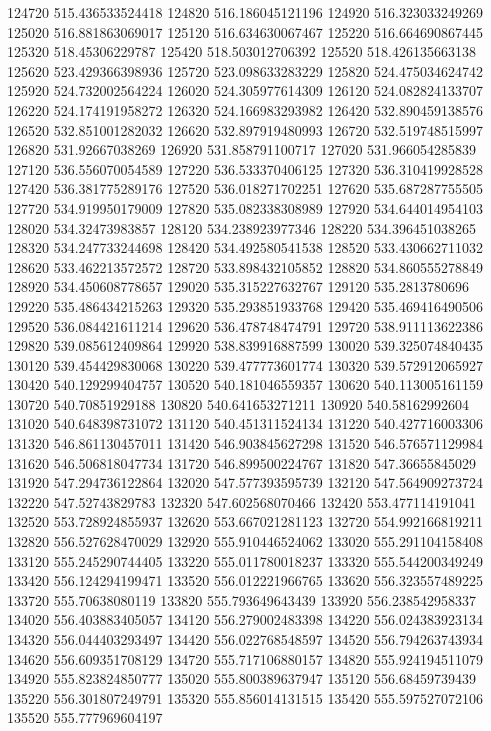 {124720 515.436533524418
124820 516.186045121196
124920 516.323033249269
125020 516.881863069017
125120 516.634630067467
125220 516.664690867445
125320 518.45306229787
125420 518.503012706392
125520 518.426135663138
125620 523.429366398936
125720 523.098633283229
125820 524.475034624742
125920 524.732002564224
126020 524.305977614309
126120 524.082824133707
126220 524.174191958272
126320 524.166983293982
126420 532.890459138576
126520 532.851001282032
126620 532.897919480993
126720 532.519748515997
126820 531.92667038269
126920 531.858791100717
127020 531.966054285839
127120 536.556070054589
127220 536.533370406125
127320 536.310419928528
127420 536.381775289176
127520 536.018271702251
127620 535.687287755505
127720 534.919950179009
127820 535.082338308989
127920 534.644014954103
128020 534.32473983857
128120 534.238923977346
128220 534.396451038265
128320 534.247733244698
128420 534.492580541538
128520 533.430662711032
128620 533.462213572572
128720 533.898432105852
128820 534.860555278849
128920 534.450608778657
129020 535.315227632767
129120 535.2813780696
129220 535.486434215263
129320 535.293851933768
129420 535.469416490506
129520 536.084421611214
129620 536.478748474791
129720 538.911113622386
129820 539.085612409864
129920 538.839916887599
130020 539.325074840435
130120 539.454429830068
130220 539.477773601774
130320 539.572912065927
130420 540.129299404757
130520 540.181046559357
130620 540.113005161159
130720 540.70851929188
130820 540.641653271211
130920 540.58162992604
131020 540.648398731072
131120 540.451311524134
131220 540.427716003306
131320 546.861130457011
131420 546.903845627298
131520 546.576571129984
131620 546.506818047734
131720 546.899500224767
131820 547.36655845029
131920 547.294736122864
132020 547.577393595739
132120 547.564909273724
132220 547.52743829783
132320 547.602568070466
132420 553.477114191041
132520 553.728924855937
132620 553.667021281123
132720 554.992166819211
132820 556.527628470029
132920 555.910446524062
133020 555.291104158408
133120 555.245290744405
133220 555.011780018237
133320 555.544200349249
133420 556.124294199471
133520 556.012221966765
133620 556.323557489225
133720 555.70638080119
133820 555.793649643439
133920 556.238542958337
134020 556.403883405057
134120 556.279002483398
134220 556.024383923134
134320 556.044403293497
134420 556.022768548597
134520 556.794263743934
134620 556.609351708129
134720 555.717106880157
134820 555.924194511079
134920 555.823824850777
135020 555.800389637947
135120 556.68459739439
135220 556.301807249791
135320 555.856014131515
135420 555.597527072106
135520 555.777969604197
}
